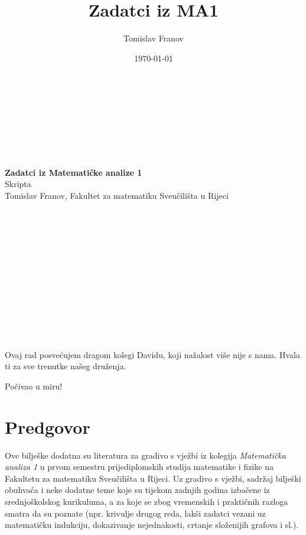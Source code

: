 \documentclass{book}
\title{Zadatci iz MA1}
\author{Tomislav Franov}
\date{\today}
\begin{document}
\begin{titlepage}
\begin{center}
\Huge
\textbf{ }\\ \textbf{ }\\ \textbf{ }\\ \textbf{ }\\ \textbf{ }\\ \textbf{ }\\
\textbf{Zadatci iz Matematičke analize 1}\\
\vspace{0.5 cm}
\huge
Skripta \textbf{ }\\
\vspace{0.5 cm}
\Large
Tomislav Franov, Fakultet za matematiku Sveučilišta u Rijeci
\end{center}
\end{titlepage}
\Large
\newpage
\thispagestyle{empty}
\begin{center}
\textbf{ }\\ \textbf{ }\\ \textbf{ }\\ \textbf{ }\\ \textbf{ }\\ \textbf{ }\\
\textbf{ }\\ \textbf{ }\\ \textbf{ }\\ \textbf{ }\\
\textbf{ }\\ \textbf{ }\\
Ovaj rad posvećujem dragom kolegi Davidu, koji nažalost više nije s nama. Hvala ti za sve trenutke našeg druženja.

Počivao u miru!\\
\end{center}
\large
\vspace{0.5 cm}
\tableofcontents
\thispagestyle{empty}
\chapter*{Predgovor}

Ove bilješke dodatna su literatura za gradivo s vježbi iz kolegija \textit{Matematička analiza 1} u prvom semestru prijediplomskih studija matematike i fizike na Fakultetu za matematiku Sveučilišta u Rijeci. Uz gradivo s vježbi, sadržaj bilješki obuhvaća i neke dodatne teme koje su tijekom zadnjih godina izbačene iz srednjoškolskog kurikuluma, a za koje se zbog vremenskih i praktičnih razloga smatra da su poznate (npr. krivulje drugog reda, lakši zadatci vezani uz matematičku indukciju, dokazivanje nejednakosti, crtanje složenijih grafova i sl.).
\end{document}
